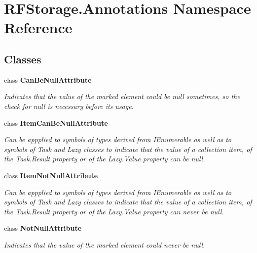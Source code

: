 \section{R\+F\+Storage.\+Annotations Namespace Reference}
\label{namespace_r_f_storage_1_1_annotations}
\subsection*{Classes}
\begin{DoxyCompactItemize}
\item 
class \textbf{ Can\+Be\+Null\+Attribute}
\begin{DoxyCompactList}\small\item\em Indicates that the value of the marked element could be {\ttfamily null} sometimes, so the check for {\ttfamily null} is necessary before its usage. \end{DoxyCompactList}\item 
class \textbf{ Item\+Can\+Be\+Null\+Attribute}
\begin{DoxyCompactList}\small\item\em Can be appplied to symbols of types derived from I\+Enumerable as well as to symbols of Task and Lazy classes to indicate that the value of a collection item, of the Task.\+Result property or of the Lazy.\+Value property can be null. \end{DoxyCompactList}\item 
class \textbf{ Item\+Not\+Null\+Attribute}
\begin{DoxyCompactList}\small\item\em Can be appplied to symbols of types derived from I\+Enumerable as well as to symbols of Task and Lazy classes to indicate that the value of a collection item, of the Task.\+Result property or of the Lazy.\+Value property can never be null. \end{DoxyCompactList}\item 
class \textbf{ Not\+Null\+Attribute}
\begin{DoxyCompactList}\small\item\em Indicates that the value of the marked element could never be {\ttfamily null}. \end{DoxyCompactList}\end{DoxyCompactItemize}
